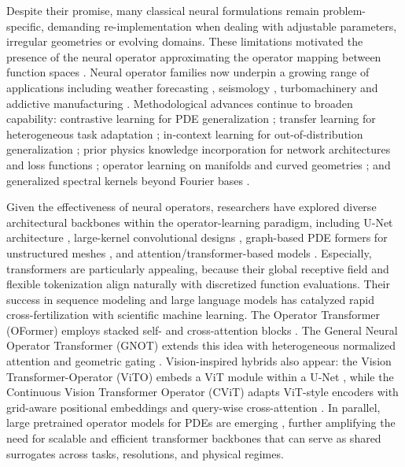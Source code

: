 \documentclass[final,3p,times]{elsarticle}
\begin{document}
Despite their promise, many classical neural formulations remain problem-specific, demanding re-implementation when dealing with adjustable parameters, irregular geometries or evolving domains. These limitations motivated the presence of the neural operator approximating the operator mapping between function spaces \cite{kovachki2023neural, lu2021learning}. Neural operator families now underpin a growing range of applications including weather forecasting
 \cite{bonev2023spherical, lam2023learning, kontolati2024learning, bonev2025fourcastnet}, seismology \cite{sun2023phase, shi2024broadband, haghighat2024deeponet},  turbomachinery \cite{li2025attention} and addictive manufacturing \cite{liu2024deep}. Methodological advances continue to broaden capability: contrastive learning for PDE generalization \cite{zhang2024deciphering, jiang2023training} ; transfer learning for heterogeneous task adaptation \cite{goswami2022deep, lyu2023multi}; in-context learning for out-of-distribution generalization \cite{yang2023context}; prior physics knowledge incorporation for network architectures \cite{long2018pde, long2019pde} and loss functions \cite{jiang2023training, li2024physics}; operator learning on manifolds and curved geometries \cite{seidman2022nomad, bonev2023spherical, li2023fourier}; and generalized spectral kernels beyond Fourier bases \cite{cao2024laplace, gupta2021multiwavelet, tripura2023wavelet, li2020neural}. 

Given the effectiveness of neural operators, researchers have explored diverse architectural backbones within the operator-learning paradigm, including U-Net architecture \cite{wen2022u}, large-kernel convolutional designs \cite{raonic2023convolutional}, graph-based PDE formers for unstructured meshes \cite{ye2024pdeformer}, and attention/transformer-based models \cite{cao2021choose, ye2024pdeformer}. Especially, transformers are particularly appealing, because their global receptive field and flexible tokenization align naturally with discretized function evaluations. Their success in sequence modeling and large language models has catalyzed rapid cross-fertilization with scientific machine learning. The Operator Transformer (OFormer) employs stacked self- and cross-attention blocks \cite{li2022transformer}. The General Neural Operator Transformer (GNOT) extends this idea with heterogeneous normalized attention and geometric gating \cite{hao2023gnot}. Vision-inspired hybrids also appear: the Vision Transformer-Operator (ViTO) embeds a ViT module within a U-Net \cite{ovadia2024vito}, while the Continuous Vision Transformer Operator (CViT) adapts ViT-style encoders with grid-aware positional embeddings and query-wise cross-attention \cite{dosovitskiy2020image}. 
In parallel, large pretrained operator models for PDEs are emerging \cite{chen2024data, subramanian2023towards, mccabe2024multiple, herde2024poseidon}, further amplifying the need for scalable and efficient transformer backbones that can serve as shared surrogates across tasks, resolutions, and physical regimes.
\end{document}

